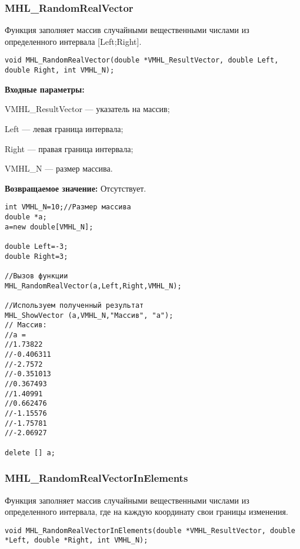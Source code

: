 \documentclass[a4paper,12pt]{article}
\begin{document}
\subsubsection{MHL\_RandomRealVector}\label{MHL_RandomRealVector}

Функция заполняет массив случайными вещественными числами из определенного интервала [Left;Right].


\begin{lstlisting}[label=code_syntax_MHL_RandomRealVector,caption=Синтаксис]
void MHL_RandomRealVector(double *VMHL_ResultVector, double Left, double Right, int VMHL_N);
\end{lstlisting}

\textbf{Входные параметры:}

 VMHL\_ResultVector --- указатель на массив;
 
 Left --- левая граница интервала;
 
 Right --- правая граница интервала;
 
 VMHL\_N --- размер массива.

\textbf{Возвращаемое значение:}
Отсутствует.


\begin{lstlisting}[label=code_use_MHL_RandomRealVector,caption=Пример использования]
int VMHL_N=10;//Размер массива
double *a;
a=new double[VMHL_N];

double Left=-3;
double Right=3;

//Вызов функции
MHL_RandomRealVector(a,Left,Right,VMHL_N);

//Используем полученный результат
MHL_ShowVector (a,VMHL_N,"Массив", "a");
// Массив:
//a =
//1.73822
//-0.406311
//-2.7572
//-0.351013
//0.367493
//1.40991
//0.662476
//-1.15576
//-1.75781
//-2.06927

delete [] a;
\end{lstlisting}

\subsubsection{MHL\_RandomRealVectorInElements}\label{MHL_RandomRealVectorInElements}

Функция заполняет массив случайными вещественными числами из определенного интервала, где на каждую координату свои границы изменения.


\begin{lstlisting}[label=code_syntax_MHL_RandomRealVectorInElements,caption=Синтаксис]
void MHL_RandomRealVectorInElements(double *VMHL_ResultVector, double *Left, double *Right, int VMHL_N);
\end{lstlisting}
\end{document}
